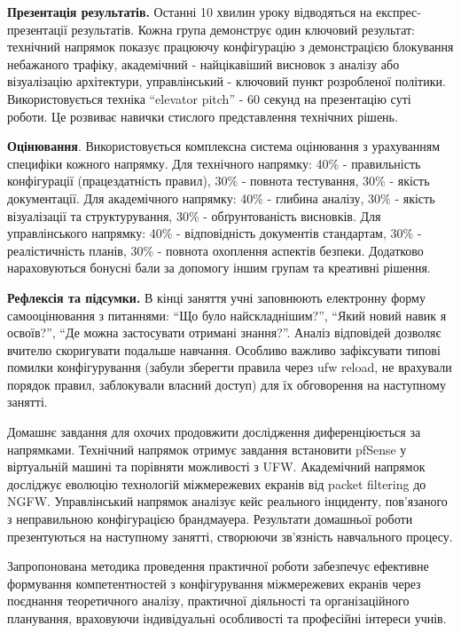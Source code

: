 \textbf{Презентація результатів. }Останні 10 хвилин уроку відводяться на експрес-презентації результатів. Кожна група демонструє один ключовий результат: технічний напрямок показує працюючу конфігурацію з демонстрацією блокування небажаного трафіку, академічний - найцікавіший висновок з аналізу або візуалізацію архітектури, управлінський - ключовий пункт розробленої політики. Використовується техніка ``elevator pitch'' - 60 секунд на презентацію суті роботи. Це розвиває навички стислого представлення технічних рішень.

\textbf{Оцінювання}. Використовується комплексна система оцінювання з урахуванням специфіки кожного напрямку. Для технічного напрямку: 40\% - правильність конфігурації (працездатність правил), 30\% - повнота тестування, 30\% - якість документації. Для академічного напрямку: 40\% - глибина аналізу, 30\% - якість візуалізації та структурування, 30\% - обґрунтованість висновків. Для управлінського напрямку: 40\% - відповідність документів стандартам, 30\% - реалістичність планів, 30\% - повнота охоплення аспектів безпеки. Додатково нараховуються бонусні бали за допомогу іншим групам та креативні рішення.

\textbf{Рефлексія та підсумки.} В кінці заняття учні заповнюють електронну форму самооцінювання з питаннями: ``Що було найскладнішим?'', ``Який новий навик я освоїв?'', ``Де можна застосувати отримані знання?''. Аналіз відповідей дозволяє вчителю скоригувати подальше навчання. Особливо важливо зафіксувати типові помилки конфігурування (забули зберегти правила через ufw reload, не врахували порядок правил, заблокували власний доступ) для їх обговорення на наступному занятті. 

Домашнє завдання для охочих продовжити дослідження диференціюється за напрямками. Технічний напрямок отримує завдання встановити pfSense у віртуальній машині та порівняти можливості з UFW. Академічний напрямок досліджує еволюцію технологій міжмережевих екранів від packet filtering до NGFW. Управлінський напрямок аналізує кейс реального інциденту, пов'язаного з неправильною конфігурацією брандмауера. Результати домашньої роботи презентуються на наступному занятті, створюючи зв'язність навчального процесу.

Запропонована методика проведення практичної роботи забезпечує ефективне формування компетентностей з конфігурування міжмережевих екранів через поєднання теоретичного аналізу, практичної діяльності та організаційного планування, враховуючи індивідуальні особливості та професійні інтереси учнів.


